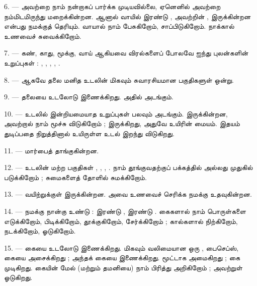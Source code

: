 6. --- அவற்றை நாம் நன்றாகப் பார்க்க முடியவில்லை, ஏனெனில் 
 அவற்றை நம்மிடமிருந்து மறைக்கின்றன. ஆனால் வாயில்
இரண்டு ,  
அவற்றின் ,  இருக்கின்றன என்பது நமக்குத்
தெரியும். வாயால் நாம் பேசுகிறோம், சாப்பிடுகிறோம். நாக்கால் உணவைச்
சுவைக்கிறோம்.

7. --- கண், காது, மூக்கு, வாய் ஆகியவை விரல்களைப் போலவே ஐந்து புலன்களின்
உறுப்புகள் : , , ,
, .

8. --- ஆகவே தலை மனித உடலின் மிகவும் சுவாரசியமான பகுதிகளுள் ஒன்று.

\VUsaut{4.4mm}
\VUsaut{3.0mm}

9. ---  தலையை உடலோடு இணைக்கிறது. அதில் 
 அடங்கும்.

10. --- உடலில் இன்றியமையாத உறுப்புகள் பலவும் அடங்கும். 
 இருக்கின்றன, அவற்றால் நாம் மூச்சு விடுகிறோம் ;
 இருக்கிறது, அதுவே உயிரின் மையம். இதயம் துடிப்பதை நிறுத்தினால்
உயிருள்ள உடல் இறந்து விடுகிறது.

11. ---  மார்பைத் தாங்குகின்றன.

12. --- உடலின் மற்ற பகுதிகள் , ,
, . நாம் தூங்குவதற்குப் பக்கத்தில் அல்லது
முதுகில் படுக்கிறோம் ; சுமைகளைத் தோளில் சுமக்கிறோம்.

13. --- வயிற்றுக்குள்   இருக்கின்றன.
அவை உணவைச் செரிக்க நமக்கு உதவுகின்றன.

\VUsaut{4.4mm}
\VUsaut{3.0mm}

14. --- நமக்கு நான்கு  உண்டு : இரண்டு ,
இரண்டு . கைகளால் நாம் பொருள்களை எடுக்கிறோம், பிடிக்கிறோம்,
தூக்குகிறோம், சேர்க்கிறோம் ; கால்களால் நிற்கிறோம், நடக்கிறோம், ஓடுகிறோம்.

15. ---  கையை உடலோடு இணைக்கிறது. மிகவும் வலிமையான ஒரு
, பைசெப்ஸ், கையை அசைக்கிறது ; அந்தக் கையை 
 இணைக்கிறது.  
மூட்டாக அமைகிறது ; கை  
முடிகிறது. கையின் மேல்  (மற்றும் தமனியை) நாம் பிரித்து
அறிகிறோம் ; அவற்றுள்  ஓடுகிறது.

